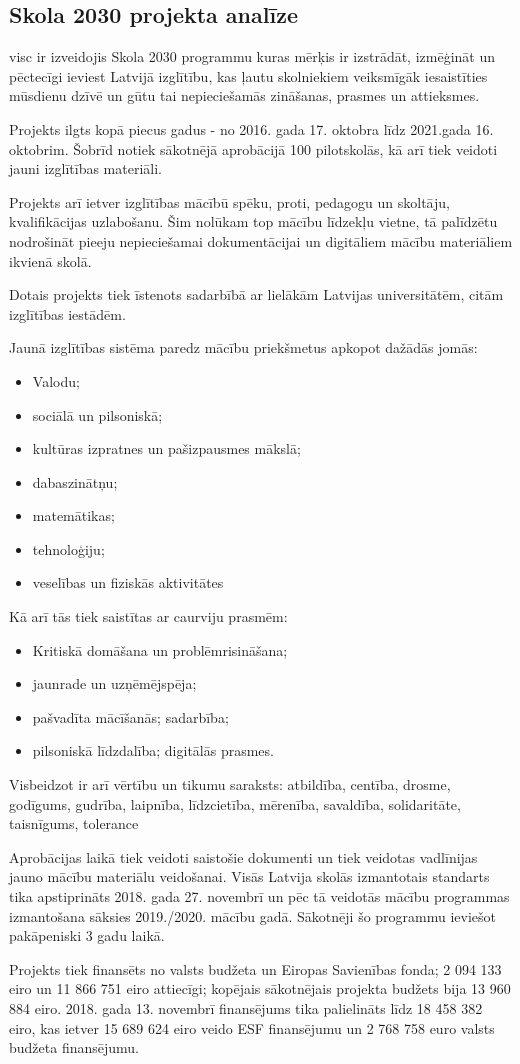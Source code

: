 \subsection{Skola 2030 projekta analīze}
\gls{visc} ir izveidojis Skola 2030 programmu kuras mērķis ir izstrādāt, izmēģināt un pēctecīgi ieviest Latvijā
izglītību, kas ļautu skolniekiem veiksmīgāk iesaistīties mūsdienu dzīvē un gūtu tai nepieciešamās zināšanas,
prasmes un attieksmes.
\par
Projekts ilgts kopā piecus gadus - no 2016. gada 17. oktobra līdz 2021.gada 16. oktobrim. Šobrīd notiek
sākotnējā aprobācijā 100 pilotskolās, kā arī tiek veidoti jauni izglītības materiāli.
\par
Projekts arī ietver izglītības mācībū spēku, proti, pedagogu un skoltāju, kvalifikācijas uzlabošanu. Šim nolūkam
top mācību līdzekļu vietne, tā palīdzētu nodrošināt pieeju nepieciešamai dokumentācijai un digitāliem mācību
materiāliem ikvienā skolā. 
\par
Dotais projekts tiek īstenots sadarbībā ar lielākām Latvijas universitātēm, citām izglītības iestādēm.
\par
Jaunā izglītības sistēma paredz mācību priekšmetus apkopot dažādās jomās:
\begin{itemize}
    \item Valodu; 
    \item sociālā un pilsoniskā;
    \item kultūras izpratnes un pašizpausmes mākslā;
    \item dabaszinātņu; 
    \item matemātikas;
    \item tehnoloģiju;
    \item veselības un fiziskās aktivitātes
\end{itemize}
Kā arī tās tiek saistītas ar caurviju prasmēm:
\begin{itemize}
    \item Kritiskā domāšana un problēmrisināšana;
    \item jaunrade un uzņēmējspēja; 
    \item pašvadīta mācīšanās; sadarbība;
    \item pilsoniskā līdzdalība; digitālās prasmes.
\end{itemize}
Visbeidzot ir arī vērtību un tikumu saraksts: atbildība, centība, drosme, godīgums, gudrība,
laipnība, līdzcietība, mērenība, savaldība, solidaritāte, taisnīgums, tolerance
\par
Aprobācijas laikā tiek veidoti saistošie dokumenti un tiek veidotas vadlīnijas jauno mācību materiālu veidošanai.
Visās Latvija skolās izmantotais standarts tika apstiprināts 2018. gada 27. novembrī un pēc tā veidotās mācību
programmas izmantošana sāksies 2019./2020. mācību gadā. Sākotnēji šo programmu ieviešot pakāpeniski 3 gadu laikā.
\par
Projekts tiek finansēts no valsts budžeta un Eiropas Savienības fonda; 2 094 133 eiro un 11 866 751 eiro attiecīgi;
kopējais sākotnējais projekta budžets bija 13 960 884 eiro. 2018. gada 13. novembrī finansējums tika palielināts
līdz 18 458 382 eiro, kas ietver 15 689 624 eiro veido ESF finansējumu un  2 768 758 euro valsts budžeta finansējumu.     
